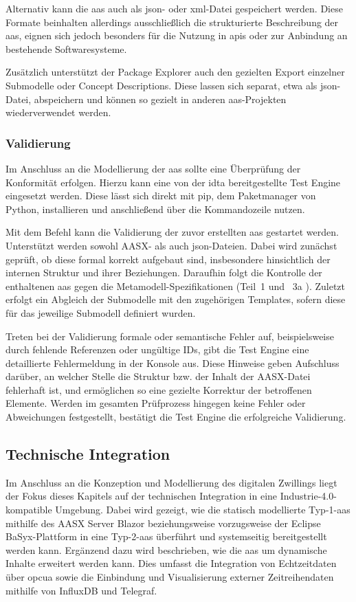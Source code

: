 Alternativ kann die \acs{aas} auch als \ac{json}- oder \ac{xml}-Datei gespeichert werden.
Diese Formate beinhalten allerdings ausschließlich die strukturierte Beschreibung der \acs{aas}, eignen sich jedoch besonders für die Nutzung in \acsp{api} oder zur Anbindung an bestehende Softwaresysteme.

Zusätzlich unterstützt der Package Explorer auch den gezielten Export einzelner Submodelle oder Concept Descriptions.
Diese lassen sich separat, etwa als \acs{json}-Datei, abspeichern und können so gezielt in anderen \acs{aas}-Projekten wiederverwendet werden.

\subsubsection{Validierung}
Im Anschluss an die Modellierung der \acs{aas} sollte eine Überprüfung der Konformität erfolgen.
Hierzu kann eine von der \acs{idta} bereitgestellte Test Engine \cite{TestEngine} eingesetzt werden. 
Diese lässt sich direkt mit pip, dem Paketmanager von Python, installieren und anschließend über die Kommandozeile nutzen.

Mit dem Befehl 
kann die Validierung der zuvor erstellten \acs{aas} gestartet werden.
Unterstützt werden sowohl AASX- als auch \acs{json}-Dateien.
Dabei wird zunächst geprüft, ob diese formal korrekt aufgebaut sind, insbesondere hinsichtlich der internen Struktur und ihrer Beziehungen.
Daraufhin folgt die Kontrolle der enthaltenen \acs{aas} gegen die Metamodell-Spezifikationen (Teil~1 \cite{SpezifikationPart1} und%
\pagebreak 
~3a \cite{SpezifikationPart3a}).
Zuletzt erfolgt ein Abgleich der Submodelle mit den zugehörigen Templates, sofern diese für das jeweilige Submodell definiert wurden.

Treten bei der Validierung formale oder semantische Fehler auf, beispielsweise durch fehlende Referenzen oder ungültige IDs, gibt die Test Engine eine detaillierte Fehlermeldung in der Konsole aus. 
Diese Hinweise geben Aufschluss darüber, an welcher Stelle die Struktur bzw. der Inhalt der AASX-Datei fehlerhaft ist, und ermöglichen so eine gezielte Korrektur der betroffenen Elemente. 
Werden im gesamten Prüfprozess hingegen keine Fehler oder Abweichungen festgestellt, bestätigt die Test Engine die erfolgreiche Validierung.

\subsection{Technische Integration}
Im Anschluss an die Konzeption und Modellierung des digitalen Zwillings liegt der Fokus dieses Kapitels auf der technischen Integration in eine Industrie-4.0-kompatible Umgebung.
Dabei wird gezeigt, wie die statisch modellierte Typ-1-\acs{aas} mithilfe des AASX Server Blazor beziehungsweise vorzugsweise der Eclipse BaSyx-Plattform in eine Typ-2-\acs{aas} überführt und systemseitig bereitgestellt werden kann.
Ergänzend dazu wird beschrieben, wie die \acs{aas} um dynamische Inhalte erweitert werden kann.
Dies umfasst die Integration von Echtzeitdaten über \acs{opcua} sowie die Einbindung und Visualisierung externer Zeitreihendaten mithilfe von InfluxDB und Telegraf.

